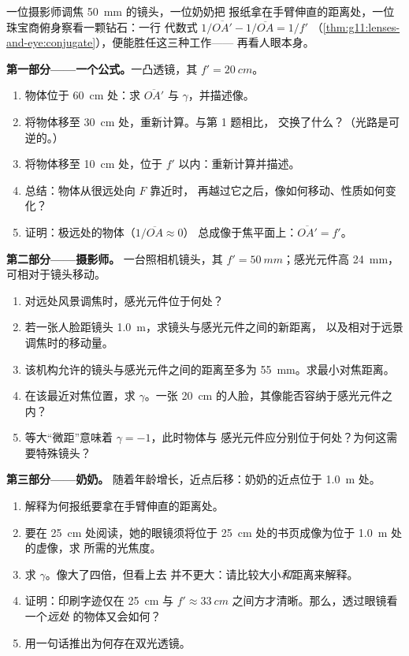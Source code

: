 \begin{problem}
\label{pb:g11:lenses-and-eye:1}
一位摄影师调焦 \qty{50}{mm} 的镜头，一位奶奶把
报纸拿在手臂伸直的距离处，一位珠宝商俯身察看一颗钻石：一行
代数式 $1/\overline{OA'} - 1/\overline{OA} = 1/f'$
（\cref{thm:g11:lenses-and-eye:conjugate}），便能胜任这三种工作——
再看人眼本身。

\medskip
\noindent\textbf{第一部分——一个公式。}一凸透镜，其
$f' = \qty{20}{cm}$。
\begin{enumerate}
  \item 物体位于 \qty{60}{cm} 处：求 $\overline{OA'}$ 与
        $\gamma$，并描述像。
  \item 将物体移至 \qty{30}{cm} 处，重新计算。与第 1 题相比，
        交换了什么？（光路是可逆的。）
  \item 将物体移至 \qty{10}{cm} 处，位于 $f'$ 以内：重新计算并描述。
  \item 总结：物体从很远处向 $F$ 靠近时，
        再越过它之后，像如何移动、性质如何变化？
  \item 证明：极远处的物体（$1/\overline{OA} \approx 0$）
        总成像于焦平面上：$\overline{OA'} = f'$。
\end{enumerate}

\medskip
\noindent\textbf{第二部分——摄影师。}
一台照相机镜头，其 $f' = \qty{50}{mm}$；感光元件高 \qty{24}{mm}，
可相对于镜头移动。
\begin{enumerate}[resume]
  \item 对远处风景调焦时，感光元件位于何处？
  \item 若一张人脸距镜头 \qty{1.0}{m}，求镜头与感光元件之间的新距离，
        以及相对于远景调焦时的移动量。
  \item 该机构允许的镜头与感光元件之间的距离至多为
        \qty{55}{mm}。求最小对焦距离。
  \item 在该最近对焦位置，求 $\gamma$。一张
        \qty{20}{cm} 的人脸，其像能否容纳于感光元件之内？
  \item 等大“微距”意味着 $\gamma = -1$，此时物体与
        感光元件应分别位于何处？为何这需要特殊镜头？
\end{enumerate}

\medskip
\noindent\textbf{第三部分——奶奶。}
随着年龄增长，近点后移：奶奶的近点位于 \qty{1.0}{m} 处。
\begin{enumerate}[resume]
  \item 解释为何报纸要拿在手臂伸直的距离处。
  \item 要在 \qty{25}{cm} 处阅读，她的眼镜须将位于
        \qty{25}{cm} 处的书页成像为位于 \qty{1.0}{m} 处的虚像，求
        所需的光焦度。
  \item 求 $\gamma$。像大了四倍，但看上去
        并不更大：请比较大小\emph{和}距离来解释。
  \item 证明：印刷字迹仅在 \qty{25}{cm} 与
        $f' \approx \qty{33}{cm}$ 之间方才清晰。那么，透过眼镜看一个\emph{远处}
        的物体又会如何？
  \item 用一句话推出为何存在双光透镜。
\end{enumerate}


\end{problem}
